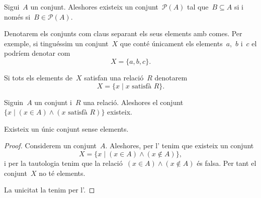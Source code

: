 \documentclass[../../main.tex]{subfiles}
\begin{document}
    \begin{axiom}
        \label{axiom:conjunt potència}
        Sigui~\(A\) un conjunt.
        Aleshores existeix un conjunt~\(\mathcal{P}(A)\) tal que~\(B\subseteq A\) si i només si~\(B\in\mathcal{P}(A)\).
    \end{axiom}
    \begin{notation}
        Denotarem els conjunts com claus separant els seus elements amb comes.
        Per exemple, si tinguéssim un conjunt~\(X\) que conté únicament els elements~\(a\),~\(b\) i~\(c\) el podríem denotar com
        \[
            X=\{a,b,c\}.
        \]

        Si tots els elements de~\(X\) satisfan una relació~\(R\) denotarem
        \[
            X=\{x\mid x\text{ satisfà }R\}.
        \]
    \end{notation}
    \begin{axiom}
        \label{axiom:axioma de separació}
        Siguin~\(A\) un conjunt i~\(R\) una relació.
        Aleshores el conjunt~\(\{x\mid(x\in A)\land(x\text{ satisfà }R)\}\) existeix.
    \end{axiom}
    \begin{proposition}
        \label{prop:conjunt buit}
        Existeix un únic conjunt sense elements.
        \begin{proof}
            Considerem un conjunt~\(A\).
            Aleshores, per l' tenim que existeix un conjunt
            \[
                X=\{x\mid(x\in A)\land(x\notin A)\},
            \]
            i per la tautologia  tenim que la relació~\((x\in A)\land(x\notin A)\) és falsa.
            Per tant el conjunt~\(X\) no té elements.

            La unicitat la tenim per l'.
        \end{proof}
    \end{proposition}
\end{document}
